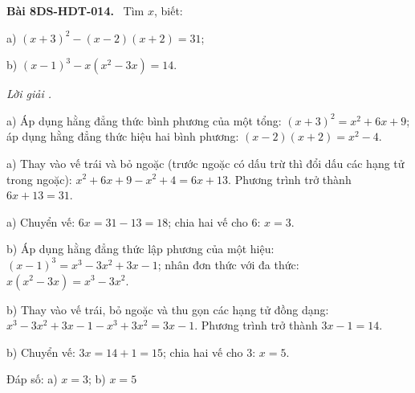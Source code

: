 \documentclass[12pt,a4paper]{article}
\newenvironment{problem}[1][]{\par\medskip\noindent\textbf{Bài #1.}\ }{\par}
\newenvironment{solution}[1][]{\par\noindent\textit{Lời giải #1.}\par}{\par}
\begin{document}
\begin{problem}[8DS-HDT-014]
Tìm $x$, biết:

a) $(x + 3)^2 - (x - 2)(x + 2) = 31$;

b) $(x - 1)^3 - x(x^2 - 3x) = 14$.

\begin{solution}
a) Áp dụng hằng đẳng thức bình phương của một tổng: $(x + 3)^2 = x^2 + 6x + 9$; áp dụng hằng đẳng thức hiệu hai bình phương: $(x - 2)(x + 2) = x^2 - 4$.

a) Thay vào vế trái và bỏ ngoặc (trước ngoặc có dấu trừ thì đổi dấu các hạng tử trong ngoặc): $x^2 + 6x + 9 - x^2 + 4 = 6x + 13$. Phương trình trở thành $6x + 13 = 31$.

a) Chuyển vế: $6x = 31 - 13 = 18$; chia hai vế cho $6$: $x = 3$.

b) Áp dụng hằng đẳng thức lập phương của một hiệu: $(x - 1)^3 = x^3 - 3x^2 + 3x - 1$; nhân đơn thức với đa thức: $x(x^2 - 3x) = x^3 - 3x^2$.

b) Thay vào vế trái, bỏ ngoặc và thu gọn các hạng tử đồng dạng: $x^3 - 3x^2 + 3x - 1 - x^3 + 3x^2 = 3x - 1$. Phương trình trở thành $3x - 1 = 14$.

b) Chuyển vế: $3x = 14 + 1 = 15$; chia hai vế cho $3$: $x = 5$.

Đáp số: a) $\boxed{x = 3}$; b) $\boxed{x = 5}$
\end{solution}
\end{problem}
\end{document}
